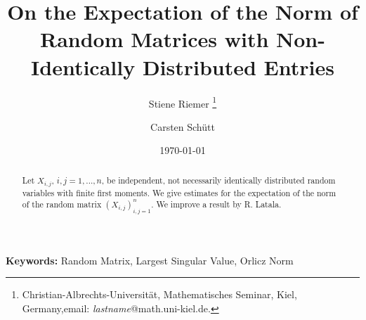 \documentclass[12pt,a4paper]{article}
\begin{document}
\title{On the Expectation of the Norm of Random Matrices with Non-Identically Distributed Entries}
\author{Stiene Riemer \thanks{Christian-Albrechts-Universit\"at, Mathematisches Seminar, Kiel, Germany,\newline email: \textit{lastname}@math.uni-kiel.de.} \and Carsten Sch\"utt \footnotemark[1]}
\date{\today}
\maketitle



\begin{abstract} Let $X_{i,j}$, $i,j=1,...,n$, be independent, not necessarily identically distributed random variables with finite first moments. We give estimates for the expectation of the norm of the random matrix $(X_{i,j})_{i,j=1}^n$.  We improve a result by R. Latala.
\end{abstract}

\textbf{Keywords:} {Random Matrix, Largest Singular Value, Orlicz Norm}\\[.2cm]
\end{document}
